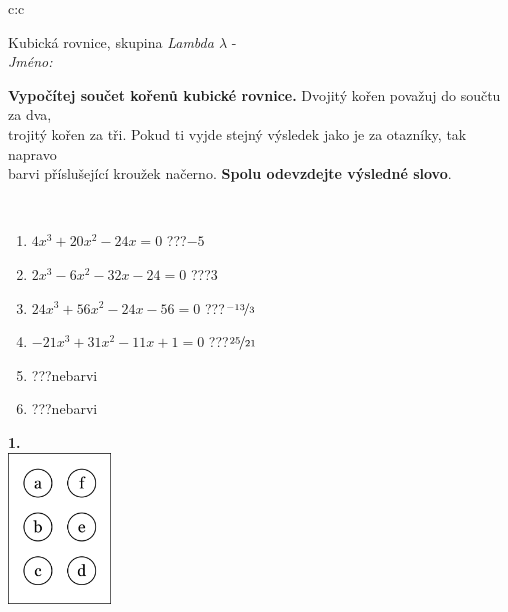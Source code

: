 \documentclass[10pt]{report}
\begin{document}
\begin{tabular}{c:c}
\begin{minipage}[c][104.5mm][t]{0.5\linewidth}
\begin{center}
\vspace{7mm}
{\huge Kubická rovnice, skupina \textit{Lambda $\lambda$} -}\\[5mm]
\textit{Jméno:}\phantom{xxxxxxxxxxxxxxxxxxxxxxxxxxxxxxxxxxxxxxxxxxxxxxxxxxxxxxxxxxxxxxxxx}\\[5mm]
\begin{minipage}{0.95\linewidth}
\begin{center}
\textbf{Vypočítej součet kořenů kubické rovnice.} Dvojitý kořen považuj do součtu za dva,\\trojitý kořen za tři. Pokud ti vyjde stejný výsledek jako je za otazníky, tak napravo\\barvi příslušející kroužek načerno. \textbf{Spolu odevzdejte výsledné slovo}.
\end{center}
\end{minipage}
\\[1mm]
\begin{minipage}{0.79\linewidth}
\begin{center}
\begin{varwidth}{\linewidth}
\begin{enumerate}
\Large
\item $4x^3+20x^2-24x=0$\quad \dotfill\; ???\;\dotfill \quad $-5$
\item $2x^3-6x^2-32x-24=0$\quad \dotfill\; ???\;\dotfill \quad $3$
\item $24x^3+56x^2-24x-56=0$\quad \dotfill\; ???\;\dotfill \quad $\nicefrac{-13}{3}$
\item $-21x^3+31x^2-11x+1=0$\quad \dotfill\; ???\;\dotfill \quad $\nicefrac{25}{21}$
\item \quad \dotfill\; ???\;\dotfill \quad nebarvi
\item \quad \dotfill\; ???\;\dotfill \quad nebarvi
\end{enumerate}
\end{varwidth}
\end{center}
\end{minipage}
\begin{minipage}{0.20\linewidth}
\begin{center}
{\Huge\bfseries 1.} \\[2mm]
\includegraphics[height=40mm]{../images/braille.png}

\end{center}
\end{minipage}
\end{center}
\end{minipage}
\end{tabular}
\end{document}
